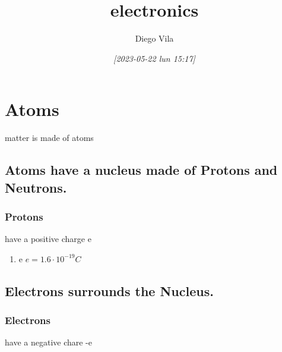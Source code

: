\documentclass[11pt]{article}
\author{Diego Vila}
\date{\textit{[2023-05-22 lun 15:17]}}
\title{electronics}
\begin{document}
\maketitle
\tableofcontents


\section{Atoms}
\label{sec:org26ccbc9}
matter is made of atoms

\subsection{Atoms have a nucleus made of Protons and Neutrons.}
\label{sec:org6541f69}

\subsubsection{Protons}
\label{sec:org2fc6da8}
have a positive charge e

\begin{enumerate}
\item e
\label{sec:org3687e1e}
\(e = 1.6 \cdot 10^{-19} C\)
\end{enumerate}

\subsection{Electrons surrounds the Nucleus.}
\label{sec:orgb2bc284}

\subsubsection{Electrons}
\label{sec:orgdc3cd5b}
have a negative chare -e
\end{document}
